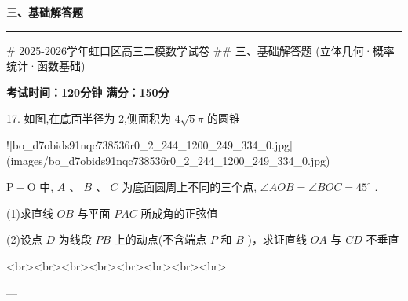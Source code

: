 \documentclass[11pt,a4paper]{article}
\begin{document}
{\centering\Large\bfseries 三、基础解答题\par}
\vspace{0.3em}
\hrule
\vspace{0.5em}

# 2025-2026学年虹口区高三二模数学试卷
## 三、基础解答题
(立体几何·概率统计·函数基础)


\textbf{考试时间：120分钟  满分：150分}


17. 如图,在底面半径为 2,侧面积为 $4\sqrt{5}\pi$ 的圆锥

![bo_d7obids91nqc738536r0_2_244_1200_249_334_0.jpg](images/bo_d7obids91nqc738536r0_2_244_1200_249_334_0.jpg)

$\mathrm{P} - \mathrm{O}$ 中, $A\text{ 、 }B\text{ 、 }C$ 为底面圆周上不同的三个点, $\angle {AOB} = \angle {BOC} = {45}^{ \circ  }$ .

(1)求直线 ${OB}$ 与平面 ${PAC}$ 所成角的正弦值

(2)设点 $D$ 为线段 ${PB}$ 上的动点(不含端点 $P$ 和 $B$ )，求证直线 ${OA}$ 与 ${CD}$ 不垂直




<br><br><br><br><br><br><br><br>


---
\end{document}
